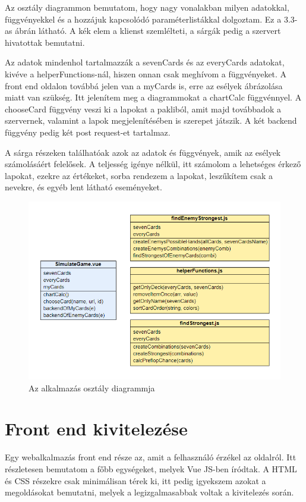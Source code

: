 Az osztály diagrammon bemutatom, hogy nagy vonalakban milyen adatokkal, függvényekkel és a hozzájuk kapcsolódó paraméterlistákkal dolgoztam. Ez a 3.3-as ábrán látható. A kék elem a klienst szemlélteti, a sárgák pedig a szervert hivatottak bemutatni.

Az adatok mindenhol tartalmazzák a sevenCards és az everyCards adatokat, kivéve a helperFunctions-nál, hiszen onnan csak meghívom a függvényeket. A front end oldalon továbbá jelen van a myCards is, erre az esélyek ábrázolása miatt van szükség. Itt jelenítem meg a diagrammokat a chartCalc függvénnyel. A chooseCard függvény veszi ki a lapokat a pakliból, amit majd továbbadok a szervernek, valamint a lapok megjelenítésében is szerepet játszik. A két backend függvény pedig két post request-et tartalmaz.

A sárga részeken találhatóak azok az adatok és függvények, amik az esélyek számolásáért felelősek. A teljesség igénye nélkül, itt számolom a lehetséges érkező lapokat, ezekre az értékeket, sorba rendezem a lapokat, leszűkítem csak a nevekre, és egyéb lent látható eseményeket.

\begin{figure}[h]
\centering
\includegraphics[scale=1]{images/class-model.png}
\caption{Az alkalmazás osztály diagrammja}
\label{fig:class-model}
\end{figure}

\section{Front end kivitelezése}
Egy webalkalmazás front end része az, amit a felhasználó érzékel az oldalról. Itt részletesen bemutatom a főbb egységeket, melyek Vue JS-ben íródtak. A HTML és CSS részekre csak minimálisan térek ki, itt pedig igyekszem azokat a megoldásokat bemutatni, melyek a legizgalmasabbak voltak a kivitelezés során. 


